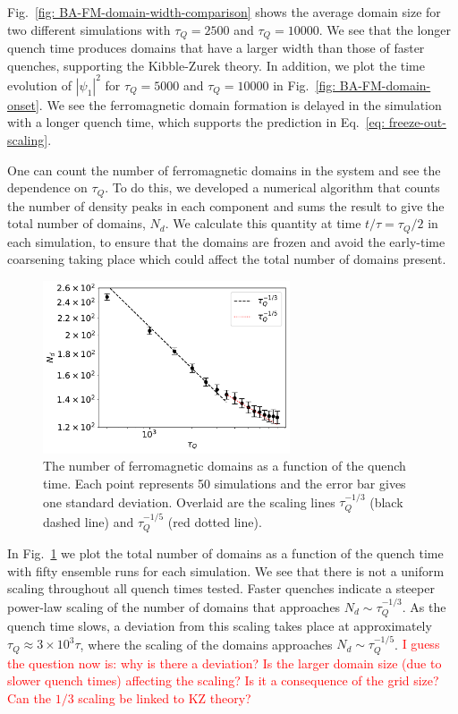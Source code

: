 Fig.~\ref{fig: BA-FM-domain-width-comparison} shows the average domain size
for two different simulations with \(\tau_Q=2500\) and \(\tau_Q=10000\).
We see that the longer quench time produces domains that have a
larger width than those of faster quenches, supporting the Kibble-Zurek theory.
In addition, we plot the time evolution of \(|\psi_1|^2\) for \(\tau_Q=5000\) and
\(\tau_Q=10000\) in Fig.~\ref{fig: BA-FM-domain-onset}.
We see the ferromagnetic domain formation is delayed in the simulation
with a longer quench time, which supports the prediction in
Eq.~\eqref{eq: freeze-out-scaling}.

One can count the number of ferromagnetic domains in the system and see the
dependence on \( \tau_Q \).
To do this, we developed a numerical algorithm that counts the number of
density peaks in each component and sums the result to give the total number of
domains, \(N_d\).
We calculate this quantity at time \(t/\tau=\tau_Q/2\) in each simulation, to
ensure that the domains are frozen and avoid the early-time coarsening
taking place which could affect the total number of domains present.
\begin{figure}
    \centering
    \includegraphics[width=0.65\textwidth]{gfx/ch-spin1/FM_domains_scaling.pdf}
    \caption{The number of ferromagnetic domains as a function of the
    quench time. Each point represents 50 simulations and the
    error bar gives one standard deviation. Overlaid are the scaling lines
    \(\tau_Q^{-1/3}\) (black dashed line) and \(\tau_Q^{-1/5}\)
    (red dotted line).\label{fig: FM-domains-scaling}}
\end{figure}
In Fig.~\ref{fig: FM-domains-scaling} we plot the total number of domains
as a function of the quench time with fifty ensemble runs for each simulation.
We see that there is not a uniform scaling throughout all quench times tested.
Faster quenches indicate a steeper power-law scaling of the number of domains
that approaches \(N_d\sim\tau_Q^{-1/3}\).
As the quench time slows, a deviation from this scaling takes place at
approximately \(\tau_Q\approx 3\times10^3\tau \), where the scaling of the
domains approaches \(N_d\sim\tau_Q^{-1/5}\).
\textcolor{red}{I guess the question now is: why is there a deviation?
Is the larger domain size (due to slower quench times) affecting the scaling?
Is it a consequence of the grid size? Can the \(1/3\) scaling be linked to KZ
theory?}

